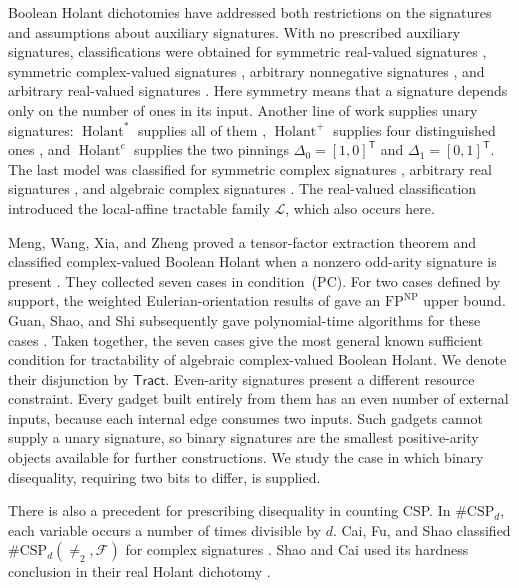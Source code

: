 \documentclass[11pt,letterpaper,onecolumn]{article}
\theoremstyle{plain}
\theoremstyle{definition}
\theoremstyle{remark}
\newcommand{\cF}{\mathcal F}
\newcommand{\cL}{\mathscr L}
\newcommand{\Holant}{\operatorname{Holant}}
\newcommand{\Tract}{\mathsf{Tract}}
\newcommand{\Neq}{\neq}
\newcommand{\DeltaZero}{\Delta_0}
\newcommand{\DeltaOne}{\Delta_1}
\begin{document}
Boolean Holant dichotomies have addressed both restrictions on the
signatures and assumptions about auxiliary signatures.  With no prescribed
auxiliary signatures, classifications were obtained for symmetric
real-valued signatures \cite{HuangLu2016}, symmetric complex-valued
signatures \cite{CaiGuoWilliams2016}, arbitrary nonnegative signatures
\cite{LinWang2018}, and arbitrary real-valued signatures
\cite{ShaoCai2020}.  Here symmetry means that a signature depends only on
the number of ones in its input.  Another line of work supplies unary
signatures: \(\Holant^*\) supplies all of them
\cite{CaiLuXia2011HolantStar}, \(\Holant^+\) supplies four distinguished
ones \cite{Backens2017}, and \(\Holant^c\) supplies the two pinnings
\(\DeltaZero=[1,0]^{\mathsf T}\) and
\(\DeltaOne=[0,1]^{\mathsf T}\).
The last model was classified for symmetric complex signatures
\cite{CaiHuangLu2012Holantc}, arbitrary real signatures
\cite{CaiLuXia2018RealHolantc}, and algebraic complex signatures
\cite{Backens2021,Backens2025}.  The real-valued classification introduced
the local-affine tractable family \(\cL\), which also occurs here.

Meng, Wang, Xia, and Zheng proved a tensor-factor extraction theorem and
classified complex-valued Boolean Holant when a nonzero odd-arity signature
is present \cite[Theorems~29 and~30]{MengWangXiaZheng2025}. They collected
seven cases in condition~(PC). For two cases defined by support, the
weighted Eulerian-orientation results of \cite{MengWangXia2025EO} gave
an \(\mathrm{FP}^{\mathrm{NP}}\) upper bound. Guan, Shao, and Shi subsequently
gave polynomial-time algorithms for these cases \cite{GuanShaoShi2026}.
Taken together, the seven cases give the most general known sufficient condition
for tractability of algebraic complex-valued Boolean Holant. We denote
their disjunction by \(\Tract\).
Even-arity signatures present a different resource constraint.  Every
gadget built entirely from them has an even number of external inputs,
because each internal edge consumes two inputs.  Such gadgets cannot
supply a unary signature, so binary signatures are the smallest
positive-arity objects available for further constructions.  We study
the case in which binary disequality, requiring two bits to differ, is
supplied.

There is also a precedent for prescribing disequality in counting CSP.
In \(\#\mathrm{CSP}_d\), each variable occurs a number of times divisible
by \(d\).  Cai, Fu, and Shao classified
\(\#\mathrm{CSP}_d(\Neq_2,\cF)\) for complex signatures
\cite[full version, Section~5.1 and Theorem~5.3]{CaiFuShao2020Entanglement}.
Shao and Cai used its hardness conclusion in their real Holant dichotomy
\cite[full version, Theorem~2.24]{ShaoCai2020}.
\end{document}
